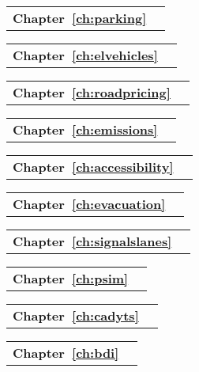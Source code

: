\begin{tabular}[width=0.48\textwidth]{@{}l l}
\textbf{Chapter~\ref{ch:parking}} &  \\
\end{tabular}

\begin{tabular}[width=0.48\textwidth]{@{}l l}
\textbf{Chapter~\ref{ch:elvehicles}} &  \\
\end{tabular}

\begin{tabular}[width=0.48\textwidth]{@{}l l}
\textbf{Chapter~\ref{ch:roadpricing}} &  \\
\end{tabular}

\begin{tabular}[width=0.48\textwidth]{@{}l l}
\textbf{Chapter~\ref{ch:emissions}} &  \\
\end{tabular}

\begin{tabular}[width=0.48\textwidth]{@{}l l}
\textbf{Chapter~\ref{ch:accessibility}} &  \\
\end{tabular}

\begin{tabular}[width=0.48\textwidth]{@{}l l}
\textbf{Chapter~\ref{ch:evacuation}} &  \\
\end{tabular}

\begin{tabular}[width=0.48\textwidth]{@{}l l}
\textbf{Chapter~\ref{ch:signalslanes}} &  \\
\end{tabular}

\begin{tabular}[width=0.48\textwidth]{@{}l l}
\textbf{Chapter~\ref{ch:psim}} &  \\
\end{tabular}

\begin{tabular}[width=0.48\textwidth]{@{}l l}
\textbf{Chapter~\ref{ch:cadyts}} &  \\
\end{tabular}

\begin{tabular}[width=0.48\textwidth]{@{}l l}
\textbf{Chapter~\ref{ch:bdi}} &  \\
\end{tabular}

